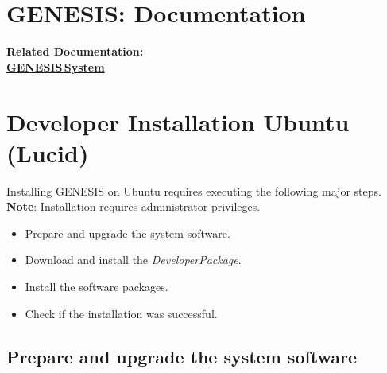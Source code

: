 \documentclass[12pt]{article}
\begin{document}
\section*{GENESIS: Documentation}

{\bf Related Documentation:} \\
\href{../genesis-system/genesis-system.tex}{\bf GENESIS\,System}

\section*{Developer Installation Ubuntu (Lucid)}

Installing GENESIS on Ubuntu requires executing the following major steps. {\bf Note}: Installation requires administrator privileges.
\begin{itemize}
   \item[] Prepare and upgrade the system software.
   \item[] Download and install the {\it DeveloperPackage}.
   \item[] Install the software packages.
   \item[] Check if the installation was successful. 
\end{itemize}

\subsection*{Prepare and upgrade the system software}
\end{document}
